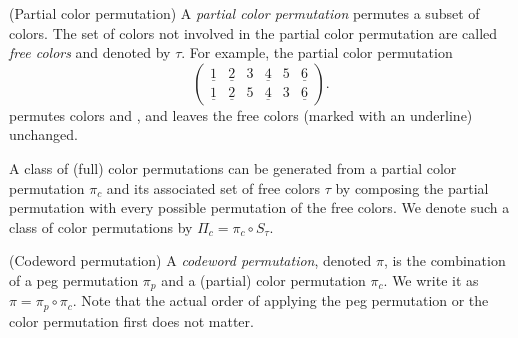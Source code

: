 \begin{definition}
(Partial color permutation) A \emph{partial color permutation} permutes a subset of colors. The set of colors not involved in the partial color permutation are called \emph{free colors} and denoted by $\tau$.
For example, the partial color permutation
\[
\begin{pmatrix}
\underline{1} & \underline{2} & 3 & \underline{4} & 5 & \underline{6} \\
\underline{1} & \underline{2} & 5 & \underline{4} & 3 & \underline{6} 
\end{pmatrix} .
\]
permutes colors  and , and leaves the free colors (marked with an underline) unchanged.
\end{definition}

A class of (full) color permutations can be generated from a partial color permutation $\pi_c$ and its associated set of free colors $\tau$ by composing the partial permutation with every possible permutation of the free colors. We denote such a class of color permutations by $\Pi_c = \pi_c \circ S_\tau$.


\begin{definition}
(Codeword permutation) A \emph{codeword permutation}, denoted $\pi$, is the combination of a peg permutation $\pi_p$ and a (partial) color permutation $\pi_c$. We write it as $\pi = \pi_p \circ \pi_c$. Note that the actual order of applying the peg permutation or the color permutation first does not matter.
\end{definition}

